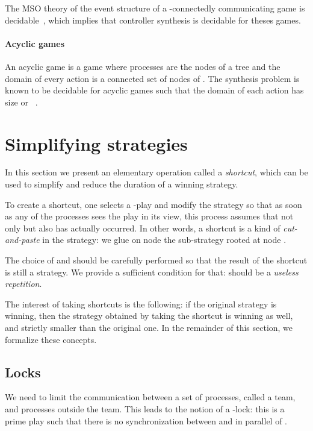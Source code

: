 \documentclass[a4paper,UKenglish]{lipics-v2016}
\begin{document}
The MSO theory of the event structure
of a -connectedly communicating game is decidable~\cite{madhu},
which implies that controller synthesis is decidable for theses games.




\paragraph*{Acyclic games}
An acyclic game is a game where processes  are the nodes of a tree 
and the domain of every action is a connected set of nodes of .
The synthesis problem is known to be decidable
for acyclic games such that the domain of each action has size  or ~\cite{acyclic}.


\section{Simplifying strategies}
\label{sec:simplifying}

In this section we present an elementary operation called a \emph{shortcut},
which can be used to simplify and reduce the duration of a winning strategy.

To create a shortcut, one selects a -play 
and modify the strategy  so that as soon as any of the processes
sees the play  in its view, this process assumes that not only  but also  has actually occurred.
In other words, a shortcut is a kind of \emph{cut-and-paste} in the strategy:
we glue on node  the sub-strategy rooted at node .

The choice of  and  should be carefully performed so that 
the result of the shortcut
is still a strategy.
We provide a sufficient condition for that:  should be a  \emph{useless repetition}.

The interest of taking shortcuts is the following:
if the original strategy is winning,
then the  strategy obtained by taking the shortcut
is winning as well,
and strictly smaller than the original one.
In the remainder of this section, we formalize these concepts.



\subsection{Locks}

We need to limit the communication between a set of processes,
called a team, and processes outside the team.
This leads to the notion of a -lock:
this is a prime play 
such that there is no synchronization  between  and  in parallel of .
\end{document}
